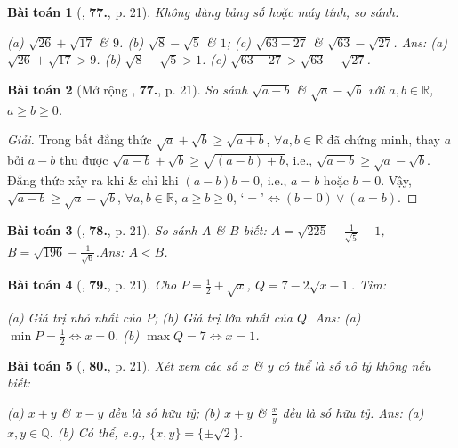 \documentclass{article}
\newtheorem{baitoan}{Bài toán}
\begin{document}
\begin{baitoan}[\cite{Tuyen_Toan_7}, \textbf{77.}, p. 21]
	Không dùng bảng số hoặc máy tính, so sánh:
	
		(a) $\sqrt{26} + \sqrt{17}$ \& $9$.
		(b) $\sqrt{8} - \sqrt{5}$ \& $1$;
		(c) $\sqrt{63 - 27}$ \& $\sqrt{63} - \sqrt{27}$.
	\hfill{\sf Ans:} (a) $\sqrt{26} + \sqrt{17} > 9$. (b) $\sqrt{8} - \sqrt{5} > 1$. (c) $\sqrt{63 - 27} > \sqrt{63} - \sqrt{27}$.
\end{baitoan}

\begin{baitoan}[Mở rộng \cite{Tuyen_Toan_7}, \textbf{77.}, p. 21]
	So sánh $\sqrt{a - b}$ \& $\sqrt{a} - \sqrt{b}$ với $a,b\in\mathbb{R}$, $a\ge b\ge 0$.
\end{baitoan}

\begin{proof}[Giải]
	Trong bất đẳng thức $\sqrt{a} + \sqrt{b}\ge\sqrt{a + b}$, $\forall a,b\in\mathbb{R}$ đã chứng minh, thay $a$ bởi $a - b$ thu được $\sqrt{a - b} + \sqrt{b}\ge\sqrt{(a - b) + b}$, i.e., $\sqrt{a - b}\ge\sqrt{a} - \sqrt{b}$. Đẳng thức xảy ra khi \& chỉ khi $(a - b)b = 0$, i.e., $a = b$ hoặc $b = 0$. Vậy, $\sqrt{a - b}\ge\sqrt{a} - \sqrt{b}$, $\forall a,b\in\mathbb{R}$, $a\ge b\ge 0$, `$=$'$\Leftrightarrow(b = 0)\lor(a = b)$.
\end{proof}

\begin{baitoan}[\cite{Tuyen_Toan_7}, \textbf{78.}, p. 21]
	So sánh $A$ \& $B$ biết: $A = \sqrt{225} - \frac{1}{\sqrt{5}} - 1$, $B = \sqrt{196} - \frac{1}{\sqrt{6}}$.\hfill{\sf Ans:} $A < B$.
\end{baitoan}

\begin{baitoan}[\cite{Tuyen_Toan_7}, \textbf{79.}, p. 21]
	Cho $P = \frac{1}{2} + \sqrt{x}$, $Q = 7 - 2\sqrt{x - 1}$. Tìm:
	
		(a) Giá trị nhỏ nhất của $P$;
		(b) Giá trị lớn nhất của $Q$.
	\hfill{\sf Ans:} (a) $\min P = \frac{1}{2}\Leftrightarrow x = 0$. (b) $\max Q = 7\Leftrightarrow x = 1$.
\end{baitoan}

\begin{baitoan}[\cite{Tuyen_Toan_7}, \textbf{80.}, p. 21]
	Xét xem các số $x$ \& $y$ có thể là số vô tỷ không nếu biết:
	
		(a) $x + y$ \& $x - y$ đều là số hữu tỷ;
		(b) $x + y$ \& $\frac{x}{y}$ đều là số hữu tỷ.
	\hfill{\sf Ans:} (a) $x,y\in\mathbb{Q}$. (b) Có thể, e.g., $\{x,y\} = \{\pm\sqrt{2}\}$.
\end{baitoan}
\end{document}
